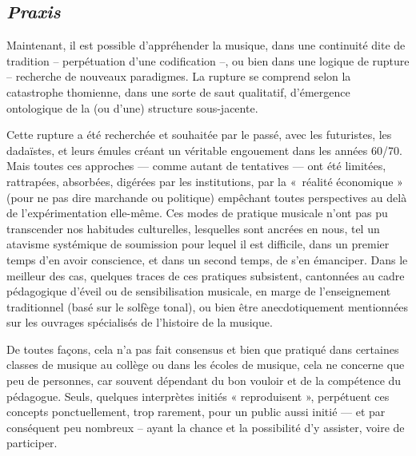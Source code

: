 \subsection*{\textit{Praxis}} 
\label{praxis}

Maintenant, il est possible d'appréhender la musique, dans une continuité dite de tradition -- perpétuation d'une codification --, ou bien dans une logique de rupture -- recherche de nouveaux paradigmes. La rupture se comprend selon la catastrophe thomienne, dans une sorte de saut qualitatif, d’émergence ontologique de la (ou d’une) structure sous-jacente. 

Cette rupture a été recherchée et souhaitée par le passé, avec les futuristes, les dadaïstes, et leurs émules créant un véritable engouement dans les années 60/70. Mais toutes ces approches — comme autant de tentatives — ont été limitées, rattrapées, absorbées, digérées par les institutions, par la \hbox{« réalité} économique » (pour ne pas dire marchande ou politique) empêchant toutes perspectives au delà de l’expérimentation elle-même. Ces modes de pratique musicale n’ont pas pu transcender nos habitudes culturelles, lesquelles sont ancrées en nous, tel un atavisme systémique de soumission pour lequel il est difficile, dans un premier temps d'en avoir conscience, et dans un second temps, de s'en émanciper.
Dans le meilleur des cas, quelques traces de ces pratiques subsistent, cantonnées au cadre pédagogique d’éveil ou de sensibilisation musicale, en marge de l'enseignement traditionnel (basé sur le solfège tonal), ou bien être anecdotiquement mentionnées sur les ouvrages spécialisés de l’histoire de la musique.

De toutes façons, cela n’a pas fait consensus et bien que pratiqué dans certaines classes de musique au collège ou dans les écoles de musique, cela ne concerne que peu de personnes, car souvent dépendant du bon vouloir et de la compétence du pédagogue. Seuls, quelques interprètes initiés « reproduisent », perpétuent  ces concepts ponctuellement, trop rarement, pour un public aussi initié — et par conséquent peu nombreux -- ayant la chance et la possibilité d’y assister, voire de participer.

